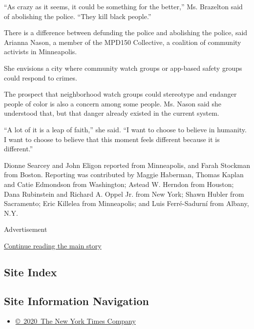 ``As crazy as it seems, it could be something for the better,'' Ms.
Brazelton said of abolishing the police. ``They kill black people.''

There is a difference between defunding the police and abolishing the
police, said Arianna Nason, a member of the MPD150 Collective, a
coalition of community activists in Minneapolis.

She envisions a city where community watch groups or app-based safety
groups could respond to crimes.

The prospect that neighborhood watch groups could stereotype and
endanger people of color is also a concern among some people. Ms. Nason
said she understood that, but that danger already existed in the current
system.

``A lot of it is a leap of faith,'' she said. ``I want to choose to
believe in humanity. I want to choose to believe that this moment feels
different because it is different.''

Dionne Searcey and John Eligon reported from Minneapolis, and Farah
Stockman from Boston. Reporting was contributed by Maggie Haberman,
Thomas Kaplan and Catie Edmondson from Washington; Astead W. Herndon
from Houston; Dana Rubinstein and Richard A. Oppel Jr. from New York;
Shawn Hubler from Sacramento; Eric Killelea from Minneapolis; and Luis
Ferré-Sadurní from Albany, N.Y.

Advertisement

\protect\hyperlink{after-bottom}{Continue reading the main story}

\hypertarget{site-index}{%
\subsection{Site Index}\label{site-index}}

\hypertarget{site-information-navigation}{%
\subsection{Site Information
Navigation}\label{site-information-navigation}}

\begin{itemize}
\tightlist
\item
  \href{https://help.nytimes3xbfgragh.onion/hc/en-us/articles/115014792127-Copyright-notice}{©~2020~The
  New York Times Company}
\end{itemize}

